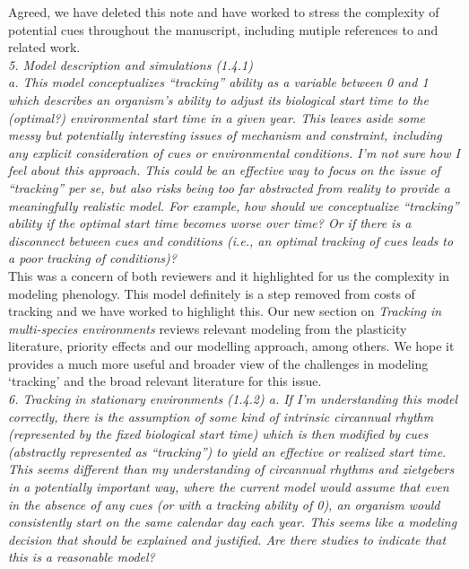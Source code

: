 \documentclass[11pt]{article}
\begin{document}
Agreed, we have deleted this note and have worked to stress the complexity of potential cues throughout the manuscript, including mutiple references to \citet{chmura2019} and related work.\\

\emph{5.      Model description and simulations (1.4.1)\\
a.      This model conceptualizes ``tracking'' ability as a variable between 0 and 1 which
describes an organism’s ability to adjust its biological start time to the (optimal?)
environmental start time in a given year. This leaves aside some messy but potentially
interesting issues of mechanism and constraint, including any explicit consideration of cues
or environmental conditions. I’m not sure how I feel about this approach. This could be an
effective way to focus on the issue of ``tracking'' per se, but also risks being too far
abstracted from reality to provide a meaningfully realistic model. For example, how should we
conceptualize ``tracking'' ability if the optimal start time becomes worse over time? Or if
there is a disconnect between cues and conditions (i.e., an optimal tracking of cues leads to
a poor tracking of conditions)?}\\

This was a concern of both reviewers and it highlighted for us the complexity in modeling phenology. This model definitely is a step removed from costs of tracking and we have worked to highlight this. Our new section on \emph{Tracking in multi-species environments} reviews relevant modeling from the plasticity literature, priority effects and our modelling approach, among others. We hope it provides a much more useful and broader view of the challenges in modeling `tracking' and the broad relevant literature for this issue. \\ 

\emph{6.      Tracking in stationary environments (1.4.2)
a.      If I’m understanding this model correctly, there is the assumption of some kind of
intrinsic circannual rhythm (represented by the fixed biological start time) which is then
modified by cues (abstractly represented as ``tracking'') to yield an effective or realized start time. This seems different than my understanding of circannual rhythms and zietgebers %
in a potentially important way, where the current model would assume that even in the absence
of any cues (or with a tracking ability of 0), an organism would consistently start on the
same calendar day each year. This seems like a modeling decision that should be explained and
justified. Are there studies to indicate that this is a reasonable model?}\\
\end{document}
